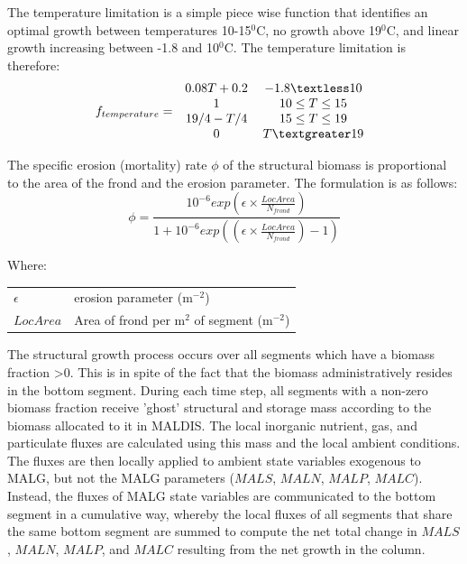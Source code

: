 \documentclass{deltares_manual}
\begin{document}
The temperature limitation is a simple piece wise function that identifies an optimal growth between temperatures 10-15$^0$C, no growth above 19$^0$C, and linear growth increasing between -1.8 and 10$^0$C. The temperature limitation is therefore:
\begin{equation}
f_{temperature} =  
\left 
.\begin{tabular}{cc}
$ 0.08T + 0.2 $    & $-1.8 \textless 10$ \\
$  1 $             & $10 \leq T \leq 15$ \\
$19/4 - T/4$       & $15 \leq T \leq 19$ \\ 
$0$                & $T \textgreater 19$ \\
\end{tabular}
\right
.\end{equation}

The specific erosion (mortality) rate $\phi$ of the structural biomass is proportional to the area of the frond and the erosion parameter. The formulation is as follows:
\begin{equation}
\phi = \frac{10^{-6}exp(\epsilon\times \frac{LocArea}{N_{frond}})}{1+10^{-6}exp((\epsilon\times \frac{LocArea}{N_{frond}})-1)}
\end{equation}

Where:\\
\begin{tabular}{ll}
$\epsilon$ & erosion parameter (m$^{-2}$)\\
$LocArea$ & Area of frond per m$^{2}$ of segment (m$^{-2}$)
\end{tabular}

The structural growth process occurs over all segments which have a biomass fraction \textgreater 0. This is in spite of the fact that the biomass administratively resides in the bottom segment. During each time step, all segments with a non-zero biomass fraction receive 'ghost' structural and storage mass according to the biomass allocated to it in MALDIS. The local inorganic nutrient, gas, and particulate fluxes are calculated using this mass and the local ambient conditions. The fluxes are then locally applied to ambient state variables exogenous to MALG, but not the MALG parameters ($MALS$, $MALN$, $MALP$, $MALC$). Instead, the fluxes of MALG state variables are communicated to the bottom segment in a cumulative way, whereby the local fluxes of all segments that share the same bottom segment are summed to compute the net total change in $MALS$, $MALN$, $MALP$, and $MALC$ resulting from the net growth in the column. 
\end{document}
